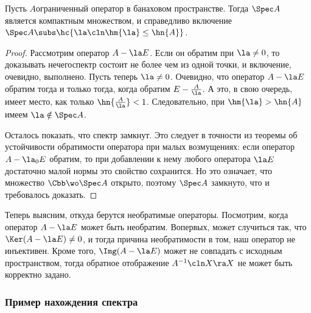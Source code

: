 \documentclass[a4paper]{article}
\begin{document}
\begin{theorem}
Пусть $A$\т ограниченный оператор в банаховом пространстве.
Тогда $\Spec A$ является компактным множеством, и справедливо включение $\Spec A \subs \hc{\la \cln \hm{\la} \le \hn{A}}$.
\end{theorem}
\begin{proof}
Рассмотрим оператор $A - \la E$. Если он обратим при $\la \neq 0$, то доказывать нечего\т спектр состоит
не более чем из одной точки, и включение, очевидно, выполнено.
Пусть теперь $\la \neq 0$. Очевидно, что оператор $A-\la E$ обратим тогда и только тогда,
когда обратим $E - \frac{A}{\la}$. А это, в свою очередь, имеет место, как только $\hn{\frac{A}{\la}}<1$.
Следовательно, при $\hm{\la} > \hn{A}$ имеем $\la \notin \Spec A$.

Осталось показать, что спектр замкнут. Это следует в точности из теоремы об устойчивости обратимости оператора
при малых возмущениях: если оператор $A-\la_0 E$ обратим, то при добавлении к нему любого оператора
$\la E$ достаточно малой нормы это свойство сохранится. Но это означает, что множество
$\Cbb \wo \Spec A$ открыто, поэтому $\Spec A$ замкнуто, что и требовалось доказать.
\end{proof}

Теперь выясним, откуда берутся необратимые операторы.
Посмотрим, когда оператор $A - \la E$ может быть необратим.
Во\д первых, может случиться так, что $\Ker (A - \la E) \neq 0$, и тогда
причина необратимости в том, наш оператор не инъективен.
Кроме того, $\Img (A - \la E)$ может не совпадать с исходным пространством,
тогда обратное отображение $A^{-1}\cln X\ra X$ не может быть корректно задано.

\subsubsection{Пример нахождения спектра}
\end{document}
